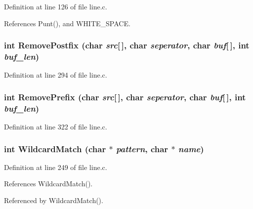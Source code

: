 Definition at line 126 of file line.c.

References Punt(), and WHITE\_\-SPACE.
\subsubsection{\setlength{\rightskip}{0pt plus 5cm}int Remove\-Postfix (char {\em src}[$\,$], char {\em seperator}, char {\em buf}[$\,$], int {\em buf\_\-len})}\label{line_8c_c1d305c49eb90cff85b02291d421257d}




Definition at line 294 of file line.c.
\subsubsection{\setlength{\rightskip}{0pt plus 5cm}int Remove\-Prefix (char {\em src}[$\,$], char {\em seperator}, char {\em buf}[$\,$], int {\em buf\_\-len})}\label{line_8c_685ca203aac471fb3367f8d524ceb00b}




Definition at line 322 of file line.c.
\subsubsection{\setlength{\rightskip}{0pt plus 5cm}int Wildcard\-Match (char $\ast$ {\em pattern}, char $\ast$ {\em name})}\label{line_8c_653809e6645e081a343e24067c0bdd09}




Definition at line 249 of file line.c.

References Wildcard\-Match().

Referenced by Wildcard\-Match().